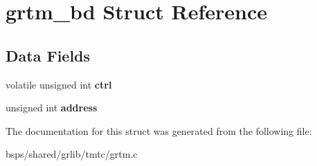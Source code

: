 \hypertarget{structgrtm__bd}{}\section{grtm\+\_\+bd Struct Reference}
\label{structgrtm__bd}
\subsection*{Data Fields}
\begin{DoxyCompactItemize}
\item 
\mbox{\label{structgrtm__bd_a58358b11efd21292008b844252ebdc77}} 
volatile unsigned int {\bfseries ctrl}
\item 
\mbox{\label{structgrtm__bd_a3505f07b4b93fc40e08cda1ec85da74f}} 
unsigned int {\bfseries address}
\end{DoxyCompactItemize}


The documentation for this struct was generated from the following file\+:\begin{DoxyCompactItemize}
\item 
bsps/shared/grlib/tmtc/grtm.\+c\end{DoxyCompactItemize}
